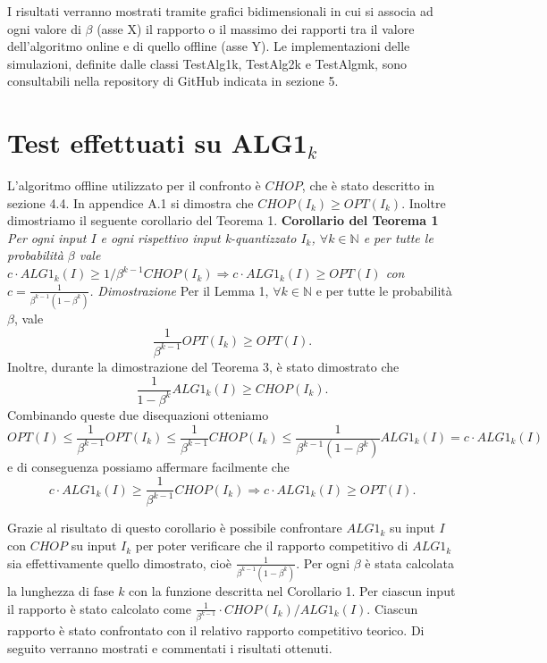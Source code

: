 \documentclass[twoside,openany,titlepage,fleqn,
	headinclude,12pt,a4paper,BCOR5mm,footinclude]{scrbook}
\newcommand*{\N}{\mathbb{N}}
\begin{document}
I risultati verranno mostrati tramite grafici bidimensionali in cui si associa ad ogni valore di $\beta$ (asse X) il rapporto o il massimo dei rapporti tra il valore dell'algoritmo online e di quello offline (asse Y). Le implementazioni delle simulazioni, definite dalle classi TestAlg1k, TestAlg2k e TestAlgmk, sono consultabili nella repository di GitHub indicata in sezione 5.

\section{Test effettuati su ALG1$_{k}$}
L'algoritmo offline utilizzato per il confronto è $CHOP$, che è stato descritto in sezione 4.4. In appendice A.1 si dimostra che $CHOP(I_{k}) \geq OPT(I_{k})$. Inoltre dimostriamo il seguente corollario del Teorema 1.
\newline \newline
\textbf{Corollario del Teorema 1}
\textit{Per ogni input $I$ e ogni rispettivo input k-quantizzato $I_{k}$, $\forall k \in \N$ e per tutte le probabilità $\beta$ vale
$ c \cdot ALG1_{k}(I) \geq 1/\beta^{k-1} CHOP(I_{k})  \Longrightarrow c \cdot ALG1_{k}(I) \geq OPT(I)$
 con $c = \frac{1}{\beta^{k-1}(1 - \beta^{k})}$.}
\newline \newline
\textit{Dimostrazione} 
Per il Lemma 1, $\forall k \in \N$ e per tutte le probabilità $\beta$, vale $$\frac{1}{\beta^{k-1}} OPT(I_{k}) \geq OPT(I).$$
Inoltre, durante la dimostrazione del Teorema 3, è stato dimostrato che $$\frac{1}{1 - \beta^{k}} ALG1_{k}(I) \geq CHOP(I_{k}).$$
Combinando queste due disequazioni otteniamo
$$OPT(I) \leq \frac{1}{\beta^{k-1}} OPT(I_{k}) \leq \frac{1}{\beta^{k-1}} CHOP(I_{k}) \leq \frac{1}{\beta^{k-1}(1 - \beta^{k})} ALG1_{k}(I) = c \cdot ALG1_{k}(I)$$
e di conseguenza possiamo affermare facilmente che 
\begin{equation}
c \cdot ALG1_{k}(I) \geq \frac{1}{\beta^{k-1}} CHOP(I_{k}) \Longrightarrow c \cdot ALG1_{k}(I) \geq OPT(I). \tag*{$\square$}
\end{equation}

Grazie al risultato di questo corollario è possibile confrontare $ALG1_{k}$ su input $I$ con $CHOP$ su input $I_{k}$ per poter verificare che il rapporto competitivo di $ALG1_{k}$ sia effettivamente quello dimostrato, cioè $\frac{1}{\beta^{k-1}(1 - \beta^{k})}$. Per ogni $\beta$ è stata calcolata la lunghezza di fase $k$ con la funzione descritta nel Corollario 1. Per ciascun input il rapporto è stato calcolato come $\frac{1}{\beta^{k-1}} \cdot CHOP(I_{k}) / ALG1_{k}(I)$. Ciascun rapporto è stato confrontato con il relativo rapporto competitivo teorico. Di seguito verranno mostrati e commentati i risultati ottenuti.
\end{document}
